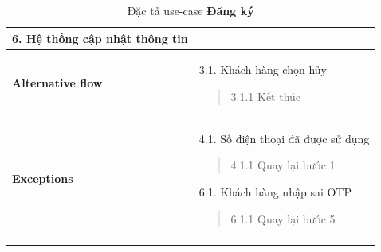 {\begin{longtable}{| p{} | p{} |}
                    6. Hệ thống cập nhật thông tin
                \\
                \hline
                \begin{flushleft}
                    \textbf{Alternative flow}
                \end{flushleft}
                &
                3.1. Khách hàng chọn hủy
                    \begin{quote} 
                    3.1.1 Kết thúc
                    \end{quote}
                \\
                \hline
                \begin{flushleft}
                    \textbf{Exceptions} 
                \end{flushleft}
                &
                4.1. Số điện thoại đã được sử dụng
                    \begin{quote} 
                    4.1.1 Quay lại bước 1
                    \end{quote}
                6.1. Khách hàng nhập sai OTP
                    \begin{quote} 
                    6.1.1 Quay lại bước 5
                    \end{quote}
                \\
                \hline
                \caption{Đặc tả use-case \textbf{Đăng ký}}
            \end{longtable}
        }
        
